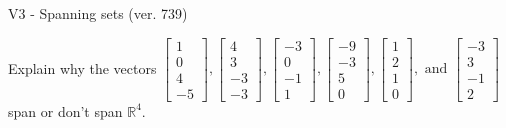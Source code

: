 \begin{exercise}
  \begin{exerciseTitle}V3 - Spanning sets (ver. 739)\end{exerciseTitle}
  \begin{exerciseStatement}
    Explain why the vectors \(\left[\begin{array}{r}
1 \\
0 \\
4 \\
-5
\end{array}\right] , \left[\begin{array}{r}
4 \\
3 \\
-3 \\
-3
\end{array}\right] , \left[\begin{array}{r}
-3 \\
0 \\
-1 \\
1
\end{array}\right] , \left[\begin{array}{r}
-9 \\
-3 \\
5 \\
0
\end{array}\right] , \left[\begin{array}{r}
1 \\
2 \\
1 \\
0
\end{array}\right] , \text{ and } \left[\begin{array}{r}
-3 \\
3 \\
-1 \\
2
\end{array}\right]\) span or don't span \(\mathbb{R}^4\). 
	



\end{exerciseStatement}
\end{exercise}

